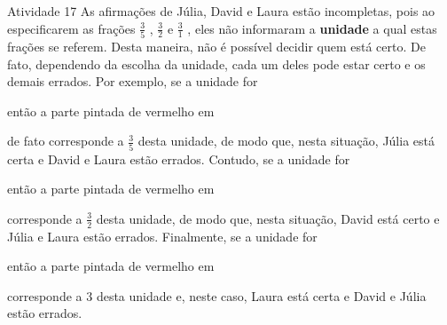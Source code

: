 \documentclass[oneside]{book}
\begin{document}
\begin{multicols}{2}
\begin{resposta*}{Atividade 17}
  As afirmações de Júlia, David e Laura estão incompletas, pois ao especificarem as frações   $\frac{3}{5}$  ,   $\frac{3}{2}$   e   $\frac{3}{1}$  , eles não informaram a   {\bf unidade}   a qual estas frações se referem. Desta maneira, não é possível decidir quem está certo. De fato, dependendo da escolha da unidade, cada um deles pode estar certo e os demais errados. Por exemplo, se a unidade for
\begin{center}
\end{center}
então a parte pintada de vermelho em 
\begin{center}
\end{center}
de fato corresponde a   $\frac{3}{5}$   desta unidade, de modo que, nesta situação, Júlia está certa e David e Laura estão errados. Contudo, se a unidade for
\begin{center}
\end{center}
então a parte pintada de vermelho em
\begin{center}
\end{center}
  corresponde a   $\frac{3}{2}$   desta unidade,  de modo que, nesta situação, David está certo e Júlia e Laura estão errados. Finalmente, se a unidade for
\begin{center}
\end{center}
então a parte pintada de vermelho em
\begin{center}
\end{center}
  corresponde a   $3$   desta unidade e, neste caso, Laura está certa e David e Júlia estão errados.
\end{resposta*}


\end{multicols}
\end{document}
